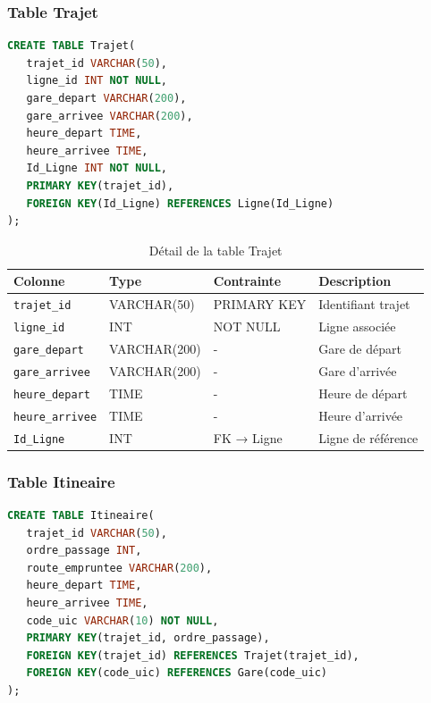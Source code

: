 \documentclass[12pt,a4paper]{article}
\begin{document}
\subsubsection{Table Trajet}
\begin{lstlisting}[language=SQL, caption=Structure de la table Trajet]
CREATE TABLE Trajet(
   trajet_id VARCHAR(50),
   ligne_id INT NOT NULL,
   gare_depart VARCHAR(200),
   gare_arrivee VARCHAR(200),
   heure_depart TIME,
   heure_arrivee TIME,
   Id_Ligne INT NOT NULL,
   PRIMARY KEY(trajet_id),
   FOREIGN KEY(Id_Ligne) REFERENCES Ligne(Id_Ligne)
);
\end{lstlisting}

\begin{table}[h!]
\centering
\begin{tabular}{|p{3.5cm}|p{2.5cm}|p{2.5cm}|p{4cm}|}
\hline
\textbf{Colonne} & \textbf{Type} & \textbf{Contrainte} & \textbf{Description} \\
\hline
\texttt{trajet\_id} & VARCHAR(50) & PRIMARY KEY & Identifiant trajet \\
\hline
\texttt{ligne\_id} & INT & NOT NULL & Ligne associée \\
\hline
\texttt{gare\_depart} & VARCHAR(200) & - & Gare de départ \\
\hline
\texttt{gare\_arrivee} & VARCHAR(200) & - & Gare d'arrivée \\
\hline
\texttt{heure\_depart} & TIME & - & Heure de départ \\
\hline
\texttt{heure\_arrivee} & TIME & - & Heure d'arrivée \\
\hline
\texttt{Id\_Ligne} & INT & FK → Ligne & Ligne de référence \\
\hline
\end{tabular}
\caption{Détail de la table Trajet}
\end{table}

\subsubsection{Table Itineaire}
\begin{lstlisting}[language=SQL, caption=Structure de la table Itineaire]
CREATE TABLE Itineaire(
   trajet_id VARCHAR(50),
   ordre_passage INT,
   route_empruntee VARCHAR(200),
   heure_depart TIME,
   heure_arrivee TIME,
   code_uic VARCHAR(10) NOT NULL,
   PRIMARY KEY(trajet_id, ordre_passage),
   FOREIGN KEY(trajet_id) REFERENCES Trajet(trajet_id),
   FOREIGN KEY(code_uic) REFERENCES Gare(code_uic)
);
\end{lstlisting}
\end{document}
